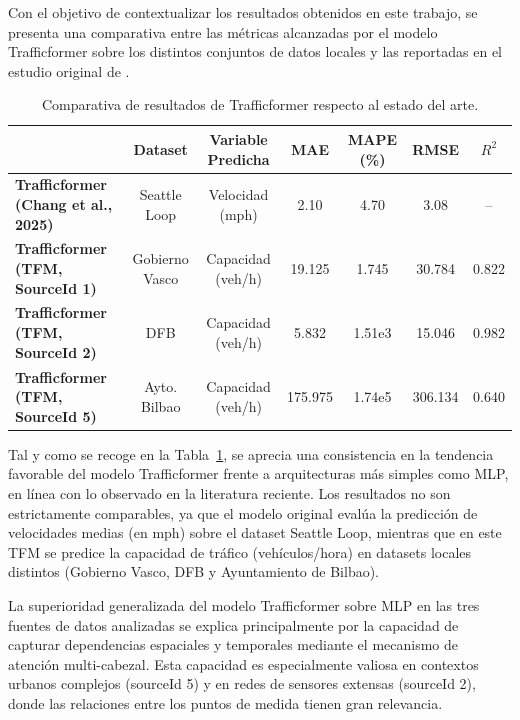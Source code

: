 Con el objetivo de contextualizar los resultados obtenidos en este trabajo, se presenta una comparativa entre las métricas alcanzadas por el modelo Trafficformer sobre los distintos conjuntos de datos locales y las reportadas en el estudio original de \cite{trafficformer}. 

\begin{table}[H]
	\centering
	\small
	\caption{Comparativa de resultados de Trafficformer respecto al estado del arte.}
	\label{tab:comparativa_trafficformer}
	\begin{tabularx}{\textwidth}{>{\raggedright\arraybackslash}X c c c c c c}
		\toprule
		& \textbf{Dataset} & \textbf{Variable Predicha} & \textbf{MAE} & \textbf{MAPE (\%)} & \textbf{RMSE} & \textbf{$R^2$} \\
		\midrule
		\textbf{Trafficformer (Chang et al., 2025)} & Seattle Loop & Velocidad (mph) & 2.10 & 4.70 & 3.08 & -- \\
		\textbf{Trafficformer (TFM, SourceId 1)} & Gobierno Vasco & Capacidad (veh/h) & 19.125 & 1.745 & 30.784 & 0.822 \\
		\textbf{Trafficformer (TFM, SourceId 2)} & DFB & Capacidad (veh/h) & 5.832 & 1.51e3 & 15.046 & 0.982 \\
		\textbf{Trafficformer (TFM, SourceId 5)} & Ayto. Bilbao & Capacidad (veh/h) & 175.975 & 1.74e5 & 306.134 & 0.640 \\
		\bottomrule
	\end{tabularx}
\end{table}

Tal y como se recoge en la Tabla~\ref{tab:comparativa_trafficformer}, se aprecia una consistencia en la tendencia favorable del modelo Trafficformer frente a arquitecturas más simples como MLP, en línea con lo observado en la literatura reciente.
Los resultados no son estrictamente comparables, ya que el modelo original evalúa la predicción de velocidades medias (en mph) sobre el dataset Seattle Loop, mientras que en este TFM se predice la capacidad de tráfico (vehículos/hora) en datasets locales distintos (Gobierno Vasco, DFB y Ayuntamiento de Bilbao).

La superioridad generalizada del modelo Trafficformer sobre MLP en las tres fuentes de datos analizadas se explica principalmente por la capacidad de capturar dependencias espaciales y temporales mediante el mecanismo de atención multi-cabezal. Esta capacidad es especialmente valiosa en contextos urbanos complejos (sourceId 5) y en redes de sensores extensas (sourceId 2), donde las relaciones entre los puntos de medida tienen gran relevancia.

